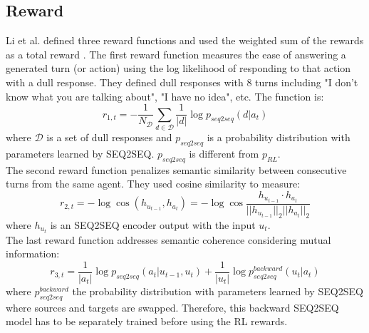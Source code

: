\subsection{Reward}
Li et al. defined three reward functions and used the weighted sum of the rewards as a total reward \cite{Li}. The first reward function measures the ease of answering a generated turn (or action) using the log likelihood of responding to that action with a dull response. They defined dull responses with 8 turns including "I don't know what you are talking about", "I have no idea", etc. The function is:
\begin{equation}
	r_{1,t} = -\frac{1}{N_{\mathcal{D}}} \sum_{d\in \mathcal{D}} \frac{1}{|d|} \log p_{seq2seq}(d|a_t)
\end{equation} 
where $\mathcal{D}$ is a set of dull responses and $p_{seq2seq}$ is a probability distribution with parameters learned by SEQ2SEQ. $p_{seq2seq}$ is different from $p_{RL}$. \\
The second reward function penalizes semantic similarity between consecutive turns from the same agent. They used cosine similarity to measure:
\begin{equation}
	r_{2,t} = -\log \cos (h_{u_{t-1}}, h_{a_t}) = -\log \cos \frac{h_{u_{t-1}}\cdot h_{a_t}}{||h_{u_{t-1}}||_2 ||h_{a_t}||_2} \label{eq:reward2}
\end{equation}
where $h_{u_{t}}$ is an SEQ2SEQ encoder output with the input $u_t$. \\
The last reward function addresses semantic coherence considering mutual information:
\begin{equation}
r_{3,t} = \frac{1}{|a_t|} \log p_{seq2seq} (a_t|u_{t-1},u_t) + \frac{1}{|u_t|} \log p_{seq2seq}^{backward}(u_t|a_t) \label{eq:reward3}
\end{equation}
where $ p_{seq2seq}^{backward}$ the probability distribution with parameters learned by SEQ2SEQ where sources and targets are swapped. Therefore, this backward SEQ2SEQ model has to be separately trained before using the RL rewards. 

